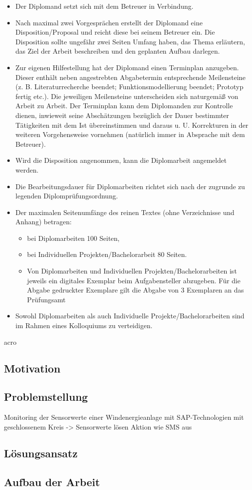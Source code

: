 \begin{itemize}
  \item Der Diplomand setzt sich mit dem Betreuer in Verbindung.
  \item Nach maximal zwei Vorgesprächen erstellt der Diplomand eine Disposition/Proposal  und reicht diese bei seinem Betreuer ein. Die Disposition sollte ungefähr zwei Seiten Umfang haben, das Thema erläutern, das Ziel der Arbeit beschreiben und den geplanten Aufbau darlegen.
  \item Zur eigenen Hilfestellung hat der Diplomand einen Terminplan anzugeben. Dieser enthält neben angestrebten Abgabetermin entsprechende Meilensteine (z. B. Literaturrecherche beendet; Funktionsmodellierung beendet; Prototyp fertig etc.). Die jeweiligen Meilensteine unterscheiden sich naturgemäß von Arbeit zu Arbeit. Der Terminplan kann dem Diplomanden zur Kontrolle dienen, inwieweit seine Abschätzungen bezüglich der Dauer bestimmter Tätigkeiten mit dem Ist übereinstimmen und daraus u. U. Korrekturen in der weiteren Vorgehensweise vornehmen (natürlich immer in Absprache mit dem Betreuer).
  \item Wird die Disposition angenommen, kann die Diplomarbeit angemeldet werden.
  \item Die Bearbeitungsdauer für Diplomarbeiten  richtet sich nach der zugrunde zu legenden Diplomprüfungsordnung.
  \item Der maximalen Seitenumfänge des reinen Textes (ohne Verzeichnisse und Anhang) betragen:
  \begin{itemize}
    \item bei Diplomarbeiten 100 Seiten,
    \item bei Individuellen Projekten/Bachelorarbeit 80 Seiten.
    \item Von Diplomarbeiten und Individuellen Projekten/Bachelorarbeiten ist jeweils ein digitales Exemplar beim Aufgabensteller abzugeben. Für die Abgabe gedruckter Exemplare gilt die Abgabe von 3 Exemplaren an das Prüfungsamt
  \end{itemize}
  \item Sowohl Diplomarbeiten als auch Individuelle Projekte/Bachelorarbeiten sind im Rahmen eines Kolloquiums zu verteidigen.
\end{itemize}

\acf{acro}

\subsection{Motivation}
\textcolor{red}{\blindtext}

\subsection{Problemstellung}
Monitoring der Sensorwerte einer Windenergieanlage mit SAP-Technologien mit geschlossenem Kreis -> Sensorwerte lösen Aktion wie SMS aus

\subsection{Lösungsansatz}
\textcolor{red}{\blindtext}

\subsection{Aufbau der Arbeit}
\textcolor{red}{\blindtext}

\newpage